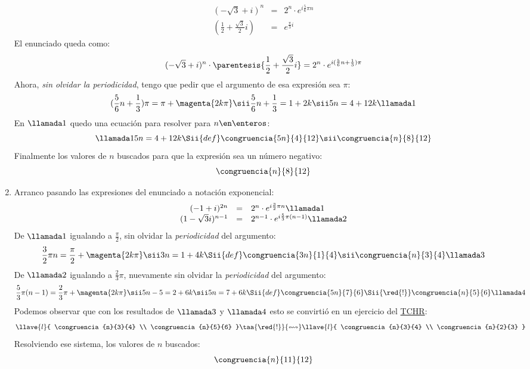 \begin{enumerate}[label=\roman*)]
        $$
          \begin{array}{rcl}
            (-\sqrt3 + i)^n                   & = & 2^n \cdot e^{i\frac{5}{6}\pi n} \\
            (\frac{1}{2} + \frac{\sqrt3}{2}i) & = & e^{\frac{\pi}{3}i}
          \end{array}
        $$
        El enunciado queda como:
        $$
          (-\sqrt3 + i)^n \cdot \parentesis{\frac{1}{2} + \frac{\sqrt3}{2}i} = 2^n \cdot e^{i (\frac{5}{6}n + \frac{1}{3})\pi }
        $$
        Ahora, \textit{sin olvidar la periodicidad}, tengo que pedir que el argumento de esa expresión sea $\pi$:
        $$
          (\frac{5}{6}n + \frac{1}{3})\pi = \pi + \magenta{2k\pi}
          \sii
          \frac{5}{6}n + \frac{1}{3} = 1 + 2k
          \sii
          5n = 4 + 12k\llamada1
        $$
        En $\llamada1$ quedo una ecuación para resolver para $n \en \enteros$:
        $$
          \llamada1
          5n = 4 + 12k
          \Sii{def}
          \congruencia{5n}{4}{12}
          \sii
          \congruencia{n}{8}{12}
        $$
        Finalmente los valores de $n$ buscados para que la expresión sea un número negativo:
        $$
          \congruencia{n}{8}{12}
        $$

  \item Arranco pasando las expresiones del enunciado a notación exponencial:
        $$
          \begin{array}{rcl}
            (-1 + i)^{2n}        & = & 2^n \cdot e^{i\frac{3}{2}\pi n} \llamada1          \\
            (1 - \sqrt3 i)^{n-1} & = & 2^{n-1}\cdot e^{i \frac{5}{3}\pi (n-1) } \llamada2
          \end{array}
        $$
        De $\llamada1$ igualando a $\frac{\pi}{2}$, sin olvidar la \textit{periodicidad} del argumento:
        $$
          \frac{3}{2} \pi n = \frac{\pi}{2} + \magenta{2k\pi}
          \sii
          3 n = 1 + 4k
          \Sii{def}
          \congruencia{3n}{1}{4}
          \sii
          \congruencia{n}{3}{4} \llamada3
        $$
        De $\llamada2$ igualando a $\frac{2}{3}\pi$, nuevamente sin olvidar la \textit{periodicidad} del argumento:
        $$
          \frac{5}{3} \pi (n-1) = \frac{2}{3}\pi + \magenta{2k\pi}
          \sii
          5 n - 5 = 2 + 6k
          \sii
          5 n = 7 + 6k
          \Sii{def}
          \congruencia{5n}{7}{6}
          \Sii{\red{!}}
          \congruencia{n}{5}{6} \llamada4
        $$
        Podemos observar que con los resultados de $\llamada3$ y $\llamada4$ esto se convirtió en un ejercicio del \href{\chinito}{TCHR}:
        $$
          \llave{l}{
            \congruencia{n}{3}{4} \\
            \congruencia{n}{5}{6}
          }
          \taa{\red{!}}{\leftrightsquigarrow}
          \llave{l}{
            \congruencia{n}{3}{4} \\
            \congruencia{n}{2}{3}
          }
        $$
        Resolviendo ese sistema, los valores de $n$ buscados:
        $$
          \congruencia{n}{11}{12}
        $$
\end{enumerate}

\begin{aportes}
  \item {}
\end{aportes}
